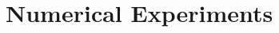 \documentclass{article}
\numberwithin{equation}{section}
\begin{document}
%
%
%
%
%


\section{Numerical Experiments}
\end{document}
